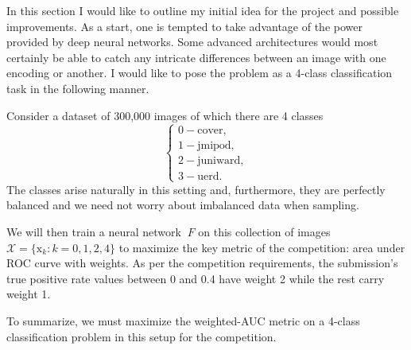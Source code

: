 \documentclass[letterpaper]{article}
\newcommand{\X}{\mathcal{X}}
\newcommand{\xvec}{\mathrm{x}}
\begin{document}
In this section I would like to outline my initial idea for the project and possible improvements. As a start, one is tempted to take advantage of the power provided by deep neural networks. Some advanced architectures would most certainly be able to catch any intricate differences between an image with one encoding or another. I would like to pose the problem as a 4-class classification task in the following manner.

Consider a dataset of 300,000 images of which there are 4 classes
\[ \begin{cases}
    0 -\text{cover},     \\
    1 - \text{jmipod},   \\
    2 - \text{juniward}, \\
    3 - \text{uerd}.
  \end{cases} \]
The classes arise naturally in this setting and, furthermore, they are perfectly balanced and we need not worry about imbalanced data when sampling.

We will then train a neural network \(\ F \) on this collection of images \( \X = \{ \xvec_k: k=0,1,2,4 \} \) to maximize the key metric of the competition: area under ROC curve with weights. As per the competition requirements, the submission's true positive rate values between 0 and 0.4 have weight 2 while the rest carry weight 1.

To summarize, we must maximize the weighted-AUC metric on a 4-class classification problem in this setup for the competition.






\printbibliography
\end{document}
